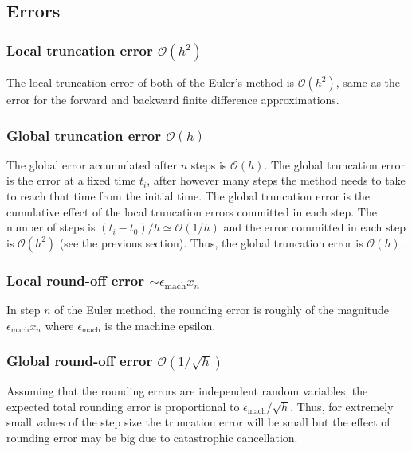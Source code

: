 \documentclass[11pt]{article}
\begin{document}
\subsection*{Errors}
\label{sec:org6e8d7fd}
\subsubsection*{Local truncation error \(\mathcal{O} (h^2)\)}
\label{sec:orga61186d}
The local truncation error of both of the Euler's method is \(\mathcal{O}\left(h^2\right)\), same as the error for the forward and backward finite difference approximations.
\subsubsection*{Global truncation error \(\mathcal{O} (h)\)}
\label{sec:org98772ed}
The global error accumulated after \(n\) steps is \(\mathcal{O}(h)\). The global truncation error is the error at a fixed time \(t_i\), after however many steps the method needs to take to reach that time from the initial time. The global truncation error is the cumulative effect of the local truncation errors committed in each step. The number of steps is \((t_i-t_0)/h \simeq \mathcal{O}(1/h)\) and the error committed in each step is \(\mathcal{O}(h^2)\) (see the previous section). Thus, the global truncation error is \(\mathcal{O}(h)\).
\subsubsection*{Local round-off error \(\sim \epsilon_{\text{mach}} x_{n}\)}
\label{sec:org4eb9881}
In step \(n\) of the Euler method, the rounding error is roughly of the magnitude \(\epsilon_{\text{mach}} x_n\) where \(\epsilon_{\text{mach}}\) is the machine epsilon.
\subsubsection*{Global round-off error \(\mathcal{O}(1/\sqrt{h})\)}
\label{sec:org07d3b47}
Assuming that the rounding errors are independent random variables, the expected total rounding error is proportional to \(\epsilon_{\text{mach}}/\sqrt{h}\). 
Thus, for extremely small values of the step size the truncation error will be small but the effect of rounding error may be big due to catastrophic cancellation.
\end{document}
